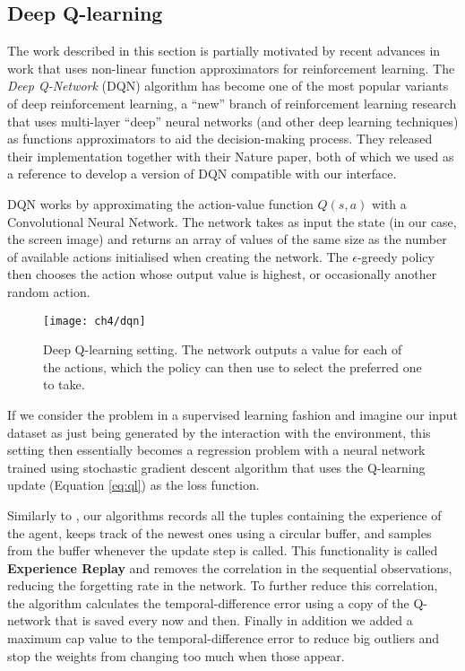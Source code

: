\subsection{Deep Q-learning}

The work described in this section is partially motivated by recent advances in
work that uses non-linear function approximators for reinforcement learning. The
\emph{Deep Q-Network} (DQN) algorithm \citep{mnih2013playing, mnih2015human} has
become one of the most popular variants of deep reinforcement learning, a
``new'' branch of reinforcement learning research that uses multi-layer ``deep''
neural networks (and other deep learning techniques) as functions approximators
to aid the decision-making process. They released their implementation together
with their Nature paper, both of which we used as a reference to develop a
version of DQN compatible with our interface.

DQN works by approximating the action-value function $Q(s, a)$ with a
Convolutional Neural Network. The network takes as input the state (in our case,
the screen image) and returns an array of values of the same size as the number
of available actions initialised when creating the network. The
$\epsilon$-greedy policy then chooses the action whose output value is highest,
or occasionally another random action.

\begin{figure}[h]
    \centering
    \texttt{[image: ch4/dqn]}
    \caption{Deep Q-learning setting. The network outputs a value for each of
      the actions, which the policy can then use to select the preferred
      one to take.}
    \label{fig:dqn}
\end{figure}

If we consider the problem in a supervised learning fashion and imagine our
input dataset as just being generated by the interaction with the environment,
this setting then essentially becomes a regression problem with a neural
network trained using stochastic gradient descent algorithm that uses the
Q-learning update (Equation \ref{eq:ql}) as the loss function.


Similarly to \cite{mnih2013playing}, our algorithms records all the tuples
containing the experience of the agent, keeps track of the newest ones using a
circular buffer, and samples from the buffer whenever the update step is called.
This functionality is called \textbf{Experience Replay} and removes the
correlation in the sequential observations, reducing the forgetting rate in the
network. To further reduce this correlation, the algorithm calculates the
temporal-difference error using a copy of the Q-network that is saved every now
and then. Finally in addition we added a maximum cap value to the
temporal-difference error to reduce big outliers and stop the weights from
changing too much when those appear.

